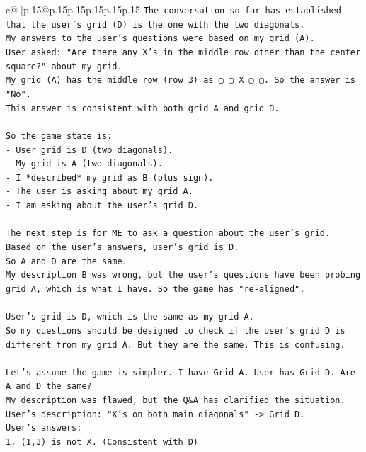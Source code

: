 \documentclass{article}
\begin{document}
{\begin{supertabular}{c@{$\;$}|p{.15\linewidth}@{}p{.15\linewidth}p{.15\linewidth}p{.15\linewidth}p{.15\linewidth}p{.15\linewidth}}
{{{\texttt{The conversation so far has established that the user's grid (D) is the one with the two diagonals.} \\
\texttt{My answers to the user's questions were based on my grid (A).} \\
\texttt{User asked: "Are there any X's in the middle row other than the center square?" about my grid.} \\
\texttt{My grid (A) has the middle row (row 3) as ▢ ▢ X ▢ ▢. So the answer is "No".} \\
\texttt{This answer is consistent with both grid A and grid D.} \\
\\ 
\texttt{So the game state is:} \\
\texttt{{-} User grid is D (two diagonals).} \\
\texttt{{-} My grid is A (two diagonals).} \\
\texttt{{-} I *described* my grid as B (plus sign).} \\
\texttt{{-} The user is asking about my grid A.} \\
\texttt{{-} I am asking about the user's grid D.} \\
\\ 
\texttt{The next step is for ME to ask a question about the user's grid.} \\
\texttt{Based on the user's answers, user's grid is D.} \\
\texttt{So A and D are the same.} \\
\texttt{My description B was wrong, but the user's questions have been probing grid A, which is what I have. So the game has "re{-}aligned".} \\
\\ 
\texttt{User's grid is D, which is the same as my grid A.} \\
\texttt{So my questions should be designed to check if the user's grid D is different from my grid A. But they are the same. This is confusing.} \\
\\ 
\texttt{Let's assume the game is simpler. I have Grid A. User has Grid D. Are A and D the same?} \\
\texttt{My description was flawed, but the Q\&A has clarified the situation.} \\
\texttt{User's description: "X's on both main diagonals" {-}> Grid D.} \\
\texttt{User's answers:} \\
\texttt{1. (1,3) is not X. (Consistent with D)} \\
}}}
\end{supertabular}}
\end{document}
